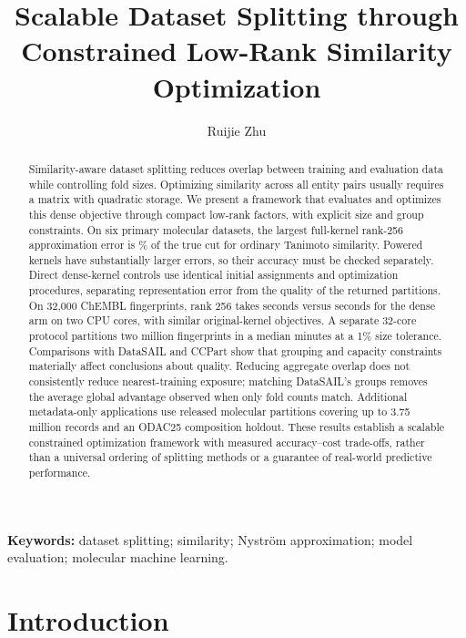 \documentclass[12pt]{article}
\title{Scalable Dataset Splitting through Constrained Low-Rank Similarity Optimization}
\author{Ruijie Zhu}
\date{}
\begin{document}
\maketitle

\begin{abstract}
Similarity-aware dataset splitting reduces overlap between training and
evaluation data while controlling fold sizes. Optimizing similarity across
all entity pairs usually requires a matrix with quadratic storage. We present
a framework that evaluates and optimizes this dense objective through compact
low-rank factors, with explicit size and group constraints. On six primary
molecular datasets, the largest full-kernel rank-256 approximation error is
\ControlsPlainCutError{}\% of the true cut for ordinary Tanimoto similarity.
Powered kernels have substantially larger errors, so their accuracy must be
checked separately. Direct dense-kernel controls use identical initial
assignments and optimization procedures, separating representation error from
the quality of the returned partitions. On 32,000 ChEMBL fingerprints, rank 256
takes \ControlsLargeFactorSeconds{} seconds versus
\ControlsLargeDenseSeconds{} seconds for the dense arm on two CPU cores, with
similar original-kernel objectives. A separate 32-core protocol partitions two
million fingerprints in a median \CurrentLargeCpuMinutes{} minutes at a 1\%
size tolerance. Comparisons with DataSAIL and CCPart show that grouping and
capacity constraints materially affect conclusions about quality. Reducing
aggregate overlap does not consistently reduce nearest-training exposure;
matching DataSAIL's groups removes the average global advantage observed when
only fold counts match. Additional metadata-only applications use released
molecular partitions covering up to 3.75 million records and an ODAC25
composition holdout. These results establish a scalable
constrained optimization framework with measured accuracy--cost trade-offs,
rather than a universal ordering of splitting methods or a guarantee of
real-world predictive performance.

\end{abstract}

\noindent\textbf{Keywords:} dataset splitting; similarity; Nystr\"om approximation;
model evaluation; molecular machine learning.

\section{Introduction}
\end{document}
